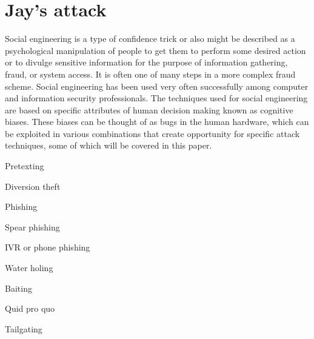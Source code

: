 \section{Jay's attack}

Social engineering is a type of confidence trick or also might be described as a psychological manipulation of people to get them to perform some desired action or to divulge sensitive information for the purpose of information gathering, fraud, or system access. It is often one of many steps in a more complex fraud scheme. Social engineering has been used very often
successfully among computer and information security professionals.
The techniques used for social engineering are based on specific attributes of human decision making known as cognitive biases. These biases can be thought of as bugs in the human hardware, which can be exploited in various combinations that create opportunity for specific attack techniques, some of which will be covered in this paper. 

Pretexting

Diversion theft

Phishing

Spear phishing

IVR or phone phishing

Water holing

Baiting

Quid pro quo

Tailgating